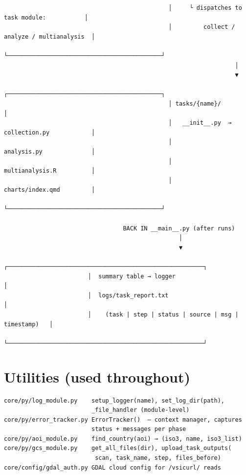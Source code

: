 \documentclass[
  letterpaper,
  DIV=11,
  numbers=noendperiod]{scrreprt}
\begin{document}
\begin{verbatim}
                                               │     └ dispatches to task module:           │
                                               │         collect / analyze / multianalysis  │
                                               └────────────────────────────────────────────┘
                                                                  │
                                                                  ▼
                                               ┌────────────────────────────────────────────┐
                                               │ tasks/{name}/                              │
                                               │   __init__.py  →  collection.py            │
                                               │                   analysis.py              │
                                               │                   multianalysis.R          │
                                               │                   charts/index.qmd         │
                                               └────────────────────────────────────────────┘

                                  BACK IN __main__.py (after runs)
                                                  │
                                                  ▼
                        ┌────────────────────────────────────────────────────────┐
                        │  summary table → logger                                │
                        │  logs/task_report.txt                                  │
                        │    (task | step | status | source | msg | timestamp)   │
                        └────────────────────────────────────────────────────────┘
\end{verbatim}

\section{Utilities (used throughout)}\label{utilities-used-throughout}

\begin{verbatim}
core/py/log_module.py    setup_logger(name), set_log_dir(path),
                         _file_handler (module-level)
core/py/error_tracker.py ErrorTracker()  — context manager, captures
                         status + messages per phase
core/py/aoi_module.py    find_country(aoi) → (iso3, name, iso3_list)
core/py/gcs_module.py    get_all_files(dir), upload_task_outputs(
                          scan, task_name, step, files_before)
core/config/gdal_auth.py GDAL cloud config for /vsicurl/ reads
\end{verbatim}
\end{document}
